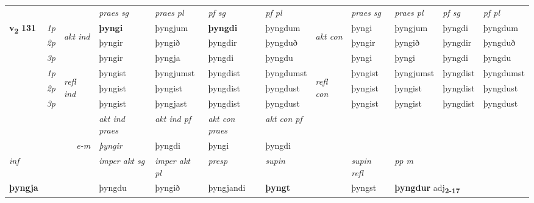 \begin{longtable}[l]{X>{\footnotesize\itshape}llXXXXlXXXX}
 & &   & \textit{praes sg}  & \textit{praes pl}    & \textit{ pf sg} & \textit{pf pl} & & \textit{praes sg}  & \textit{praes pl}    & \textit{pf sg} & \textit{pf pl }  \\ \cmidrule{4-7} \cmidrule{9-12}
 \multirow{2}{*}{{{\textbf{v{\textsubscript{2}}} \Large{\textbf{131}}}}}  & 1p & \multirow{3}{*}{\begin{turn}{90}\textit{akt ind}\end{turn}} & \textbf{þyngi} & þyngjum & \textbf{þyngdi} & þyngdum & \multirow{3}{*}{\begin{turn}{90}\textit{akt con}\end{turn}} &þyngi & þyngjum & þyngdi & þyngdum\\*
 & 2p &  &  þyngir  & þyngið & þyngdir & þyngduð & & þyngir & þyngið & þyngdir & þyngduð \\*
 & 3p &  & þyngir & þyngja & þyngdi & þyngdu & & þyngi & þyngi& þyngdi & þyngdu \\*
\cmidrule{4-7} \cmidrule{9-12}
 & 1p & \multirow{3}{*}{\begin{turn}{90}\textit{refl ind}\end{turn}}  & þyngist & þyngjumst & þyngdist & þyngdumst & \multirow{3}{*}{\begin{turn}{90}\textit{refl con}\end{turn}}  &þyngist & þyngjumst & þyngdist & þyngdumst \\*
 & 2p &  & þyngist & þyngist & þyngdist & þyngdust & &þyngist & þyngist & þyngdist & þyngdust \\*
 & 3p  & & þyngist & þyngjast & þyngdist & þyngdust & & þyngist & þyngist& þyngdist & þyngdust \\*
\cmidrule{4-7} \cmidrule{9-12}

   && &  \textit{akt ind praes} & \textit{akt ind pf} & \textit{akt con praes} & \textit{akt con pf} \\*
\multicolumn{3}{r}{\textit{e-m}} & þyngir & þyngdi & þyngi & þyngdi \\*

\cmidrule{4-7}
   {\textit{inf}} & &  & \textit{imper akt sg} & \textit{imper akt pl}   & \textit{presp} & \textit{supin} && \textit{supin refl} & \textit{pp m} \\*
  {\textbf{þyngja}} & && þyngdu  & þyngið   & þyngjandi &  \textbf{þyngt} && þyngst & \multicolumn{2}{l}{\textbf{þyngdur} adj\textbf{\textsubscript{2-17}}} \\*

\midrule


\end{longtable}
